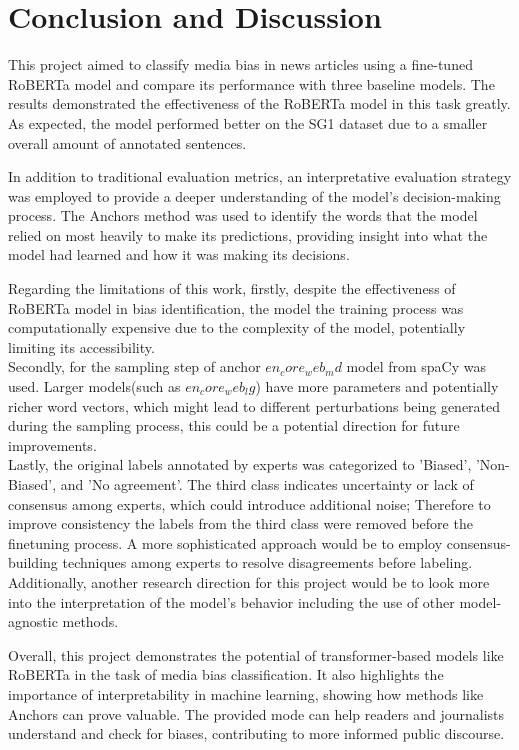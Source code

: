 \documentclass[11pt,a4paper]{article}
\begin{document}
\section{Conclusion and Discussion}
This project aimed to classify media bias in news articles using a fine-tuned RoBERTa model and compare its performance with three baseline models. The results demonstrated the effectiveness of the RoBERTa model in this task greatly. As expected, the model performed better on the SG1 dataset due to a smaller overall amount of annotated sentences.

In addition to traditional evaluation metrics, an interpretative evaluation strategy was employed to provide a deeper understanding of the model’s decision-making process. The Anchors method was used to identify the words that the model relied on most heavily to make its predictions, providing insight into what the model had learned and how it was making its decisions.

Regarding the limitations of this work, firstly, despite the effectiveness of RoBERTa model in bias identification, the model the training process was computationally expensive due to the complexity of the model, potentially limiting its accessibility.\\
Secondly, for the sampling step of anchor $en_core_web_md$ model from spaCy was used. Larger models(such as $en_core_web_lg$) have more parameters and potentially richer word vectors, which might lead to different perturbations being generated during the sampling process, this could be a potential direction for future improvements.\\
Lastly, the original labels annotated by experts was categorized to 'Biased', 'Non-Biased', and 'No agreement'. The third class indicates uncertainty or lack of consensus among experts, which could introduce additional noise; Therefore to improve consistency the labels from the third class were removed before the finetuning process. A more sophisticated approach would be to employ consensus-building techniques among experts to resolve disagreements before labeling.\\
Additionally, another research direction for this project would be to look more into the interpretation of the model's behavior including the use of other model-agnostic methods.

Overall, this project demonstrates the potential of transformer-based models like RoBERTa in the task of media bias classification. It also highlights the importance of interpretability in machine learning, showing how methods like Anchors can prove valuable. The provided mode can help readers and journalists understand and check for biases, contributing to more informed public discourse.
\newpage


\end{document}
